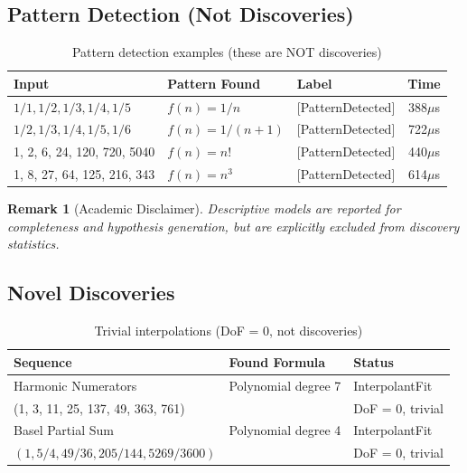 \documentclass[11pt,a4paper]{article}
\newtheorem{remark}{Remark}
\begin{document}
\subsection{Pattern Detection (Not Discoveries)}

\begin{table}[h]
\centering
\begin{tabular}{|l|l|l|c|}
\hline
\textbf{Input} & \textbf{Pattern Found} & \textbf{Label} & \textbf{Time} \\
\hline
$1/1, 1/2, 1/3, 1/4, 1/5$ & $f(n) = 1/n$ & [PatternDetected] & 388$\mu$s \\
$1/2, 1/3, 1/4, 1/5, 1/6$ & $f(n) = 1/(n+1)$ & [PatternDetected] & 722$\mu$s \\
1, 2, 6, 24, 120, 720, 5040 & $f(n) = n!$ & [PatternDetected] & 440$\mu$s \\
1, 8, 27, 64, 125, 216, 343 & $f(n) = n^3$ & [PatternDetected] & 614$\mu$s \\
\hline
\end{tabular}
\caption{Pattern detection examples (these are NOT discoveries)}
\end{table}

\begin{remark}[Academic Disclaimer]
Descriptive models are reported for completeness and hypothesis generation, but are explicitly excluded from discovery statistics.
\end{remark}

\subsection{Novel Discoveries}

\begin{table}[h]
\centering
\begin{tabular}{|l|l|l|}
\hline
\textbf{Sequence} & \textbf{Found Formula} & \textbf{Status} \\
\hline
Harmonic Numerators & Polynomial degree 7 & InterpolantFit \\
(1, 3, 11, 25, 137, 49, 363, 761) & & DoF = 0, trivial \\
\hline
Basel Partial Sum & Polynomial degree 4 & InterpolantFit \\
$(1, 5/4, 49/36, 205/144, 5269/3600)$ & & DoF = 0, trivial \\
\hline
\end{tabular}
\caption{Trivial interpolations (DoF = 0, not discoveries)}
\end{table}
\end{document}
